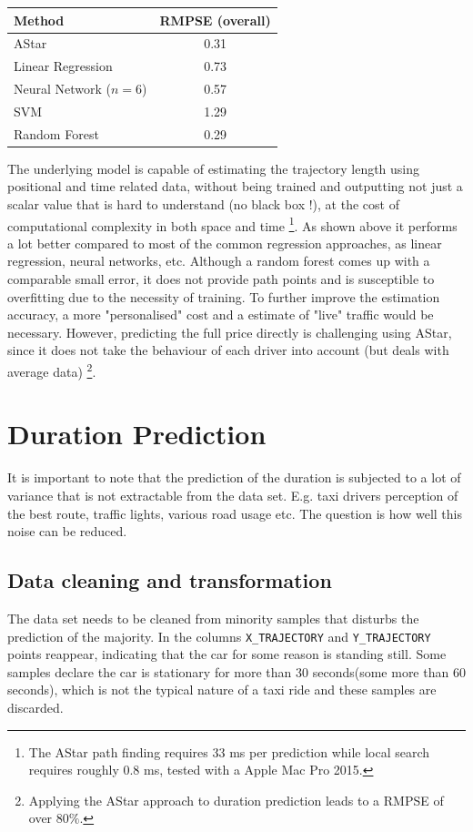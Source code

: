 \documentclass{article}
\begin{document}
\begin{multicols}{2}
\begin{center}
\begin{tabular}{l|c}
Method & RMPSE (overall) \\
\hline\hline
AStar                    & 0.31 \\
Linear Regression        & 0.73 \\
Neural Network ($n = 6$) & 0.57 \\
SVM                      & 1.29 \\
Random Forest            & 0.29
\end{tabular}
\end{center}

The underlying model is capable of estimating the trajectory length using positional and time related data, without being trained and outputting not just a scalar value that is hard to understand (no black box !), at the cost of computational complexity in both space and time \footnote{The AStar path finding requires 33 ms per prediction while local search requires roughly 0.8 ms, tested with a Apple Mac Pro 2015.}. As shown above it performs a lot better compared to most of the common regression approaches, as linear regression, neural networks, etc. Although a random forest comes up with a comparable small error, it does not provide path points and is susceptible to overfitting due to the necessity of training. To further improve the estimation accuracy, a more "personalised" cost and a estimate of "live" traffic would be necessary. However, predicting the full price directly is challenging using AStar, since it does not take the behaviour of each driver into account (but deals with average data) \footnote{Applying the AStar approach to duration prediction leads to a RMPSE of over $80 \%$.}.

\section{Duration Prediction}
It is important to note that the prediction of the duration is subjected to a lot of variance that is not extractable from the data set. E.g. taxi drivers perception of the best route, traffic lights, various road usage etc. The question is how well this noise can be reduced.\\

\subsection{Data cleaning and transformation}
The data set needs to be cleaned from minority samples that disturbs the prediction of the majority. In the columns \texttt{X\_TRAJECTORY} and \texttt{Y\_TRAJECTORY}  points reappear, indicating that the car for some reason is standing still. Some samples declare the car is stationary for more than 30 seconds(some more than 60 seconds), which is not the typical nature of a taxi ride and these samples are discarded.\\


\end{multicols}
\end{document}
